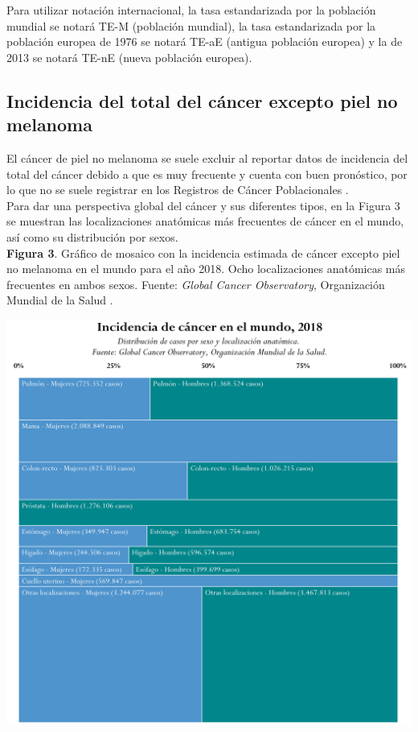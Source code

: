 Para utilizar notación internacional, la tasa estandarizada por la población mundial se notará TE-M (población mundial), la tasa estandarizada por la población europea de 1976 se notará TE-aE (antigua población europea) y la de 2013 se notará TE-nE (nueva población europea).

\subsection{Incidencia del total del cáncer excepto piel no melanoma}

El cáncer de piel no melanoma se suele excluir al reportar datos de incidencia del total del cáncer debido a que es muy frecuente y cuenta con buen pronóstico, por lo que no se suele registrar en los Registros de Cáncer Poblacionales \cite{Gordon2013, Madan2010}.\\

Para dar una perspectiva global del cáncer y sus diferentes tipos, en la Figura 3 se muestran las localizaciones anatómicas más frecuentes de cáncer en el mundo, así como su distribución por sexos.\\

\textbf{Figura 3}. Gráfico de mosaico con la incidencia estimada de cáncer excepto piel no melanoma en el mundo para el año 2018. Ocho localizaciones anatómicas más frecuentes en ambos sexos. Fuente: \textit{Global Cancer Observatory}, Organización Mundial de la Salud \cite{GCO}.
\begin{center}
	\includegraphics[width=1\textwidth]{figuras/03_marimekko_gco_incidencia.png} \\
\end{center}

